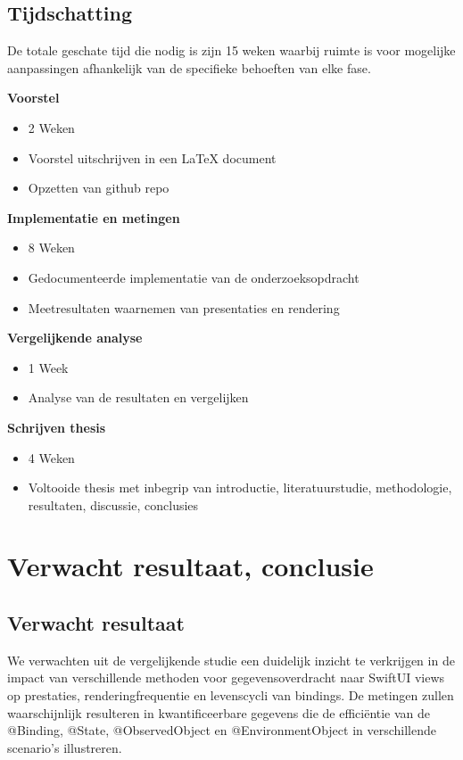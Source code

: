 \subsection{Tijdschatting}
De totale geschate tijd die nodig is zijn 15 weken waarbij ruimte is voor mogelijke aanpassingen afhankelijk van de specifieke behoeften van elke fase.

\textbf{Voorstel}
\begin{itemize}
    \item {2 Weken}
    \item {Voorstel uitschrijven in een LaTeX document}
    \item {Opzetten van github repo}
\end{itemize}

\textbf{Implementatie en metingen}
\begin{itemize}
    \item {8 Weken}
    \item {Gedocumenteerde implementatie van de onderzoeksopdracht}
    \item {Meetresultaten waarnemen van presentaties en rendering}
\end{itemize}

\textbf{Vergelijkende analyse}
\begin{itemize}
    \item {1 Week}
    \item {Analyse van de resultaten en vergelijken}
\end{itemize}

\textbf{Schrijven thesis}
\begin{itemize}
    \item {4 Weken}
    \item {Voltooide thesis met inbegrip van introductie, literatuurstudie, methodologie, resultaten, discussie, conclusies}
\end{itemize}



\section{Verwacht resultaat, conclusie}
\label{sec:verwachte_resultaten}


\subsection{Verwacht resultaat}
We verwachten uit de vergelijkende studie een duidelijk inzicht te verkrijgen in de impact van verschillende methoden voor gegevensoverdracht naar SwiftUI views op prestaties, renderingfrequentie en levenscycli van bindings. De metingen zullen waarschijnlijk resulteren in kwantificeerbare gegevens die de efficiëntie van de @Binding, @State, @ObservedObject en @EnvironmentObject in verschillende scenario's illustreren.

